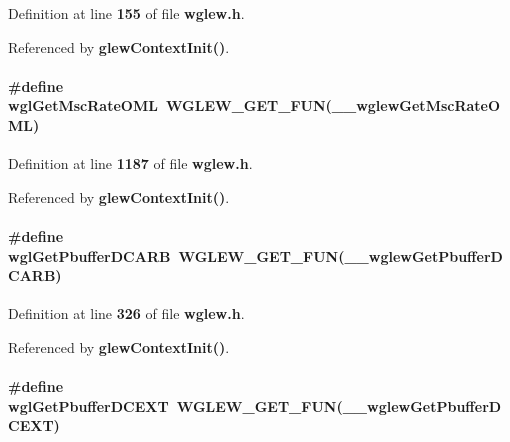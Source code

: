 Definition at line {\bf 155} of file {\bf wglew.\+h}.



Referenced by {\bf glew\+Context\+Init()}.

\paragraph[{wgl\+Get\+Msc\+Rate\+O\+ML}]{\setlength{\rightskip}{0pt plus 5cm}\#define wgl\+Get\+Msc\+Rate\+O\+ML~{\bf W\+G\+L\+E\+W\+\_\+\+G\+E\+T\+\_\+\+F\+UN}({\bf \+\_\+\+\_\+wglew\+Get\+Msc\+Rate\+O\+ML})}\label{wglew_8h_afef814622a563732f5beb4704e956fd2}


Definition at line {\bf 1187} of file {\bf wglew.\+h}.



Referenced by {\bf glew\+Context\+Init()}.

\paragraph[{wgl\+Get\+Pbuffer\+D\+C\+A\+RB}]{\setlength{\rightskip}{0pt plus 5cm}\#define wgl\+Get\+Pbuffer\+D\+C\+A\+RB~{\bf W\+G\+L\+E\+W\+\_\+\+G\+E\+T\+\_\+\+F\+UN}({\bf \+\_\+\+\_\+wglew\+Get\+Pbuffer\+D\+C\+A\+RB})}\label{wglew_8h_a62cc2dd14065b9bba106e03861222e51}


Definition at line {\bf 326} of file {\bf wglew.\+h}.



Referenced by {\bf glew\+Context\+Init()}.

\paragraph[{wgl\+Get\+Pbuffer\+D\+C\+E\+XT}]{\setlength{\rightskip}{0pt plus 5cm}\#define wgl\+Get\+Pbuffer\+D\+C\+E\+XT~{\bf W\+G\+L\+E\+W\+\_\+\+G\+E\+T\+\_\+\+F\+UN}({\bf \+\_\+\+\_\+wglew\+Get\+Pbuffer\+D\+C\+E\+XT})}\label{wglew_8h_ae4813910547c100a407047e97e0e697f}


